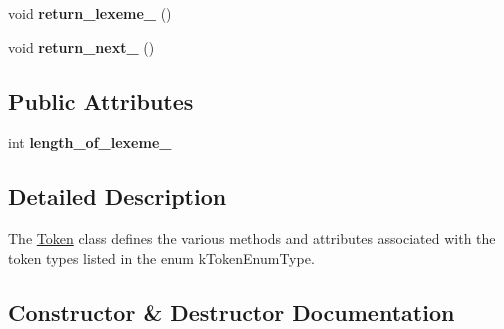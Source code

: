 \begin{DoxyCompactItemize}
\item 
void {\bfseries return\+\_\+lexeme\+\_\+} ()\hypertarget{classfcal_1_1scanner_1_1Token_ad28333fbaaf84bc18edcd13780b535f5}{}\label{classfcal_1_1scanner_1_1Token_ad28333fbaaf84bc18edcd13780b535f5}

\item 
void {\bfseries return\+\_\+next\+\_\+} ()\hypertarget{classfcal_1_1scanner_1_1Token_ab3b4163def2fe6eb7424cd1e639b680f}{}\label{classfcal_1_1scanner_1_1Token_ab3b4163def2fe6eb7424cd1e639b680f}

\end{DoxyCompactItemize}
\subsection*{Public Attributes}
\begin{DoxyCompactItemize}
\item 
int {\bfseries length\+\_\+of\+\_\+lexeme\+\_\+}\hypertarget{classfcal_1_1scanner_1_1Token_a05f4953cc69eb7441b0e18095a862630}{}\label{classfcal_1_1scanner_1_1Token_a05f4953cc69eb7441b0e18095a862630}

\end{DoxyCompactItemize}


\subsection{Detailed Description}
The \hyperlink{classfcal_1_1scanner_1_1Token}{Token} class defines the various methods and attributes associated with the token types listed in the enum k\+Token\+Enum\+Type. 

\subsection{Constructor \& Destructor Documentation}
